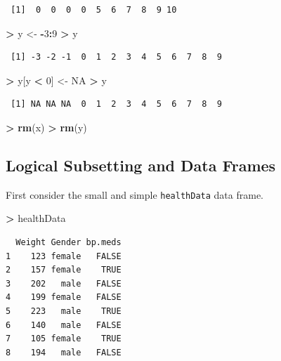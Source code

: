 \documentclass[]{krantz}
\makeatletter
\newenvironment{Shaded}{\begin{snugshade}}{\end{snugshade}}
\newcommand{\KeywordTok}[1]{\textcolor[rgb]{0.27,0.27,0.27}{\textbf{#1}}}
\newcommand{\DecValTok}[1]{\textcolor[rgb]{0.06,0.06,0.06}{#1}}
\newcommand{\StringTok}[1]{\textcolor[rgb]{0.5,0.5,0.5}{#1}}
\newcommand{\OtherTok}[1]{\textcolor[rgb]{0.37,0.37,0.37}{#1}}
\newcommand{\OperatorTok}[1]{\textcolor[rgb]{0.43,0.43,0.43}{\textbf{#1}}}
\newcommand{\NormalTok}[1]{#1}
\newenvironment{kframe}{%
\medskip{}
\setlength{\fboxsep}{.8em}
 \def\at@end@of@kframe{}%
 \ifinner\ifhmode%
  \def\at@end@of@kframe{\end{minipage}}%
  \begin{minipage}{\columnwidth}%
 \fi\fi%
 \def\FrameCommand##1{\hskip\@totalleftmargin \hskip-\fboxsep
 \colorbox{shadecolor}{##1}\hskip-\fboxsep
     \hskip-\linewidth \hskip-\@totalleftmargin \hskip\columnwidth}%
 \MakeFramed {\advance\hsize-\width
   \@totalleftmargin\z@ \linewidth\hsize
   \@setminipage}}%
 {\par\unskip\endMakeFramed%
 \at@end@of@kframe}
\renewenvironment{Shaded}{\begin{kframe}}{\end{kframe}}
\makeatother
\begin{document}
\begin{verbatim}
 [1]  0  0  0  0  5  6  7  8  9 10
\end{verbatim}

\begin{Shaded}
\begin{Highlighting}[]
\OperatorTok{>}\StringTok{ }\NormalTok{y <-}\StringTok{ }\OperatorTok{-}\DecValTok{3}\OperatorTok{:}\DecValTok{9}
\OperatorTok{>}\StringTok{ }\NormalTok{y}
\end{Highlighting}
\end{Shaded}

\begin{verbatim}
 [1] -3 -2 -1  0  1  2  3  4  5  6  7  8  9
\end{verbatim}

\begin{Shaded}
\begin{Highlighting}[]
\OperatorTok{>}\StringTok{ }\NormalTok{y[y }\OperatorTok{<}\StringTok{ }\DecValTok{0}\NormalTok{] <-}\StringTok{ }\OtherTok{NA}
\OperatorTok{>}\StringTok{ }\NormalTok{y}
\end{Highlighting}
\end{Shaded}

\begin{verbatim}
 [1] NA NA NA  0  1  2  3  4  5  6  7  8  9
\end{verbatim}

\begin{Shaded}
\begin{Highlighting}[]
\OperatorTok{>}\StringTok{ }\KeywordTok{rm}\NormalTok{(x)}
\OperatorTok{>}\StringTok{ }\KeywordTok{rm}\NormalTok{(y)}
\end{Highlighting}
\end{Shaded}

\subsection{Logical Subsetting and Data
Frames}\label{logical-subsetting-and-data-frames}

First consider the small and simple \texttt{healthData} data frame.

\begin{Shaded}
\begin{Highlighting}[]
\OperatorTok{>}\StringTok{ }\NormalTok{healthData}
\end{Highlighting}
\end{Shaded}

\begin{verbatim}
  Weight Gender bp.meds
1    123 female   FALSE
2    157 female    TRUE
3    202   male   FALSE
4    199 female   FALSE
5    223   male    TRUE
6    140   male   FALSE
7    105 female    TRUE
8    194   male   FALSE
\end{verbatim}
\end{document}
